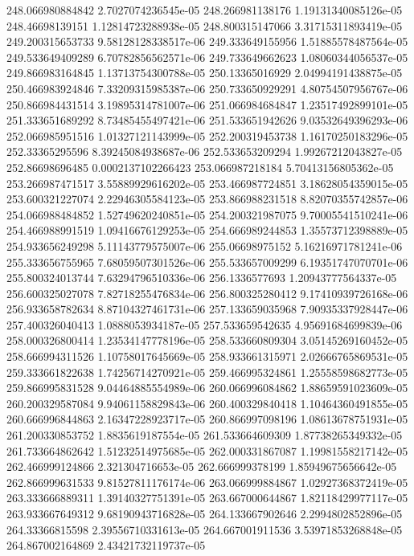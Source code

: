 {248.066980884842 2.7027074236545e-05
248.266981138176 1.19131340085126e-05
248.46698139151 1.12814723288938e-05
248.800315147066 3.31715311893419e-05
249.200315653733 9.58128128338517e-06
249.333649155956 1.51885578487564e-05
249.533649409289 6.70782856562571e-06
249.733649662623 1.08060344056537e-05
249.866983164845 1.13713754300788e-05
250.13365016929 2.04994191438875e-05
250.466983924846 7.33209315985387e-06
250.733650929291 4.80754507956767e-06
250.866984431514 3.19895314781007e-06
251.066984684847 1.23517492899101e-05
251.333651689292 8.73485455497421e-06
251.533651942626 9.03532649396293e-06
252.066985951516 1.01327121143999e-05
252.200319453738 1.16170250183296e-05
252.33365295596 8.39245084938687e-06
252.533653209294 1.99267212043827e-05
252.86698696485 0.0002137102266423
253.066987218184 5.70413156805362e-05
253.266987471517 3.55889929616202e-05
253.466987724851 3.18628054359015e-05
253.600321227074 2.22946305584123e-05
253.866988231518 8.82070355742857e-06
254.066988484852 1.52749620240851e-05
254.200321987075 9.70005541510241e-06
254.466988991519 1.09416676129253e-05
254.666989244853 1.35573712398889e-05
254.933656249298 5.11143779575007e-06
255.06698975152 5.16216971781241e-06
255.333656755965 7.68059507301526e-06
255.533657009299 6.19351747070701e-06
255.800324013744 7.63294796510336e-06
256.1336577693 1.20943777564337e-05
256.600325027078 7.82718255476834e-06
256.800325280412 9.17410939726168e-06
256.933658782634 8.87104327461731e-06
257.133659035968 7.90935337928447e-06
257.400326040413 1.0888053934187e-05
257.533659542635 4.95691684699839e-06
258.000326800414 1.23534147778196e-05
258.533660809304 3.05145269160452e-05
258.666994311526 1.10758017645669e-05
258.933661315971 2.02666765869531e-05
259.333661822638 1.74256714270921e-05
259.466995324861 1.25558598682773e-05
259.866995831528 9.04464885554989e-06
260.066996084862 1.88659591023609e-05
260.200329587084 9.94061158829843e-06
260.400329840418 1.10464360491855e-05
260.666996844863 2.16347228923717e-05
260.866997098196 1.08613678751931e-05
261.200330853752 1.8835619187554e-05
261.533664609309 1.87738265349332e-05
261.733664862642 1.51232514975685e-05
262.000331867087 1.19981558217142e-05
262.466999124866 2.321304716653e-05
262.666999378199 1.85949675656642e-05
262.866999631533 9.81527811176174e-06
263.066999884867 1.02927368372419e-05
263.333666889311 1.39140327751391e-05
263.667000644867 1.82118429977117e-05
263.933667649312 9.68190943716828e-05
264.133667902646 2.2994802852896e-05
264.33366815598 2.39556710331613e-05
264.667001911536 3.53971853268848e-05
264.867002164869 2.43421732119737e-05
}
